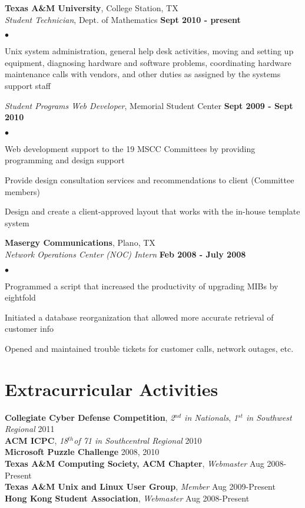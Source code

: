 \documentclass[margin,line]{res}
\newenvironment{list2}{
  \begin{list}{$\bullet$}{%
      \setlength{\itemsep}{0in}
      \setlength{\parsep}{0in} \setlength{\parskip}{0in}
      \setlength{\topsep}{0in} \setlength{\partopsep}{0in} 
      \setlength{\leftmargin}{0.18in}}}{\end{list}}
\begin{document}
\begin{resume}
{\bf Texas A\&M University}, College Station, TX \\
{\em Student Technician}, Dept. of Mathematics \hfill {\bf Sept 2010 - present} \\
\vspace{-3mm}
\begin{list2}
\item Unix system administration, general help desk activities, moving and setting up
  equipment, diagnosing hardware and software problems, coordinating hardware maintenance
  calls with vendors, and other duties as assigned by the systems support staff
\end{list2}

{\em Student Programs Web Developer}, Memorial Student Center \hfill {\bf Sept 2009 - Sept 2010} \\
\vspace{-3mm}
\begin{list2}
\item Web development support to the 19 MSCC Committees by providing programming and design support
\item Provide design consultation services and recommendations to client (Committee members)
\item Design and create a client-approved layout that works with the in-house template system
\end{list2}

{\bf Masergy Communications}, Plano, TX \\
{\em Network Operations Center (NOC) Intern} \hfill {\bf Feb 2008 - July 2008} \\
\vspace{-3mm}
\begin{list2}
\item Programmed a script that increased the productivity of upgrading MIBs by eightfold
\item Initiated a database reorganization that allowed more accurate retrieval of customer info
\item Opened and maintained trouble tickets for customer calls, network outages, etc.
\end{list2}

%
%
\section{\sc Extracurricular Activities}
{\bf Collegiate Cyber Defense Competition}, {\em 2$^{nd}$ in Nationals}, {\em 1$^{st}$ in Southwest Regional}  \hfill 2011 \\
{\bf ACM ICPC}, {\em 18$^{th}$of 71 in Southcentral Regional} \hfill 2010 \\
{\bf Microsoft Puzzle Challenge} \hfill 2008, 2010 \\
{\bf Texas A\&M Computing Society, ACM Chapter}, {\em Webmaster} \hfill Aug 2008-Present \\
{\bf Texas A\&M Unix and Linux User Group}, {\em Member} \hfill Aug 2009-Present \\
{\bf Hong Kong Student Association}, {\em Webmaster} \hfill Aug 2008-Present


\end{resume}
\end{document}

